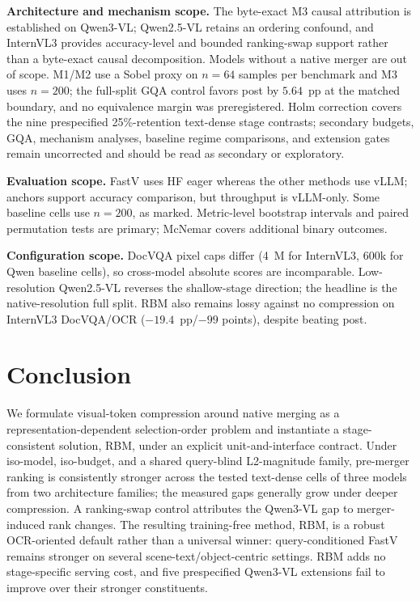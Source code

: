 \documentclass[journal]{IEEEtran}
\begin{document}
\textbf{Architecture and mechanism scope.} The byte-exact M3 causal attribution
is established on Qwen3-VL; Qwen2.5-VL retains an ordering confound, and
InternVL3 provides accuracy-level and bounded ranking-swap support rather than a
byte-exact causal decomposition. Models without a native merger are out of
scope. M1/M2 use a Sobel proxy on $n=64$ samples per benchmark and M3 uses
$n=200$; the full-split GQA control favors post by $5.64$~pp at the matched
boundary, and no equivalence margin was preregistered. Holm correction covers the
nine prespecified 25\%-retention text-dense stage contrasts; secondary budgets,
GQA, mechanism analyses, baseline regime comparisons, and extension gates
remain uncorrected and should be read as secondary or exploratory.

\textbf{Evaluation scope.} FastV uses HF eager whereas the other methods use
vLLM; anchors support accuracy comparison, but throughput is vLLM-only. Some
baseline cells use $n=200$, as marked. Metric-level bootstrap intervals and
paired permutation tests are primary; McNemar covers additional binary outcomes.

\textbf{Configuration scope.} DocVQA pixel caps differ (4~M for InternVL3,
600k for Qwen baseline cells), so cross-model absolute scores are incomparable.
Low-resolution Qwen2.5-VL reverses the shallow-stage direction; the headline is
the native-resolution full split. RBM also remains lossy against no compression
on InternVL3 DocVQA/OCR ($-19.4$~pp/$-99$ points), despite beating post.

\section{Conclusion}\label{sec:conclusion}

We formulate visual-token compression around native merging as a
representation-dependent selection-order problem and instantiate a
stage-consistent solution, RBM, under an explicit unit-and-interface contract.
Under iso-model, iso-budget, and a shared query-blind L2-magnitude family,
pre-merger ranking is consistently stronger across the tested text-dense cells
of three models from two architecture families;
the measured gaps generally grow under deeper compression. A ranking-swap
control attributes the Qwen3-VL gap to merger-induced rank changes. The
resulting training-free method, RBM, is a
robust OCR-oriented default rather than a universal winner: query-conditioned
FastV remains stronger on several scene-text/object-centric settings. RBM adds
no stage-specific serving cost, and five prespecified Qwen3-VL extensions fail
to improve over their stronger constituents.



\end{document}
